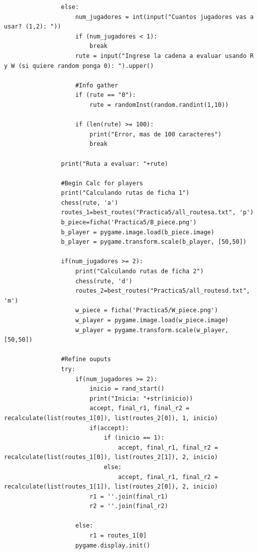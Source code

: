 \documentclass{article}
\begin{document}
\begin{lstlisting}
                else:    
                    num_jugadores = int(input("Cuantos jugadores vas a usar? (1,2): "))
                    if (num_jugadores < 1):
                        break
                    rute = input("Ingrese la cadena a evaluar usando R y W (si quiere random ponga 0): ").upper()
                
                    #Info gather
                    if (rute == "0"):
                        rute = randomInst(random.randint(1,10))
                
                    if (len(rute) >= 100):
                        print("Error, mas de 100 caracteres")
                        break
                
                print("Ruta a evaluar: "+rute)
                
                #Begin Calc for players
                print("Calculando rutas de ficha 1")
                chess(rute, 'a')
                routes_1=best_routes("Practica5/all_routesa.txt", 'p')
                b_piece=ficha('Practica5/B_piece.png')
                b_player = pygame.image.load(b_piece.image)
                b_player = pygame.transform.scale(b_player, [50,50])
                
                if(num_jugadores >= 2): 
                    print("Calculando rutas de ficha 2")
                    chess(rute, 'd')
                    routes_2=best_routes("Practica5/all_routesd.txt", 'm')
                    w_piece = ficha('Practica5/W_piece.png')
                    w_player = pygame.image.load(w_piece.image)
                    w_player = pygame.transform.scale(w_player, [50,50])
                
                #Refine ouputs
                try:
                    if(num_jugadores >= 2):
                        inicio = rand_start()
                        print("Inicia: "+str(inicio))
                        accept, final_r1, final_r2 = recalculate(list(routes_1[0]), list(routes_2[0]), 1, inicio)
                        if(accept):
                            if (inicio == 1):
                                accept, final_r1, final_r2 = recalculate(list(routes_1[0]), list(routes_2[1]), 2, inicio)
                            else:
                                accept, final_r1, final_r2 = recalculate(list(routes_1[1]), list(routes_2[0]), 2, inicio)
                        r1 = ''.join(final_r1)
                        r2 = ''.join(final_r2)
                        
                    else:
                        r1 = routes_1[0]
                    pygame.display.init()
                    

\end{lstlisting}
\end{document}
